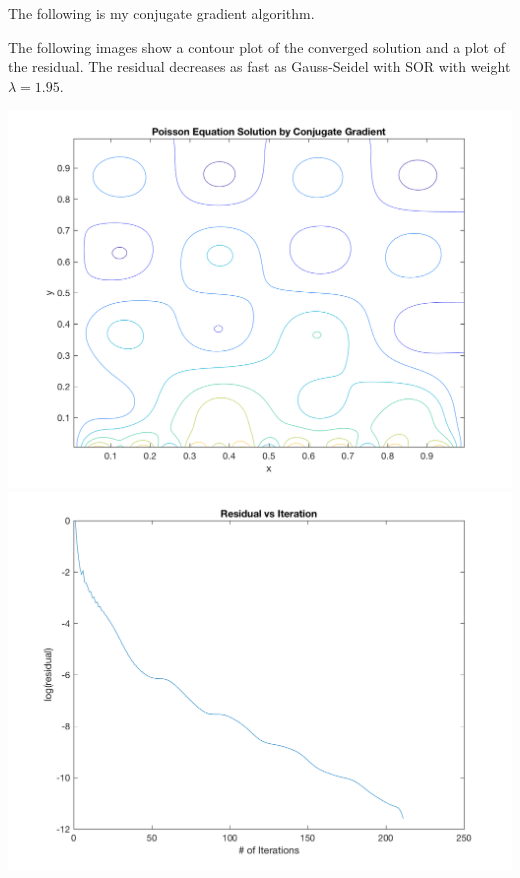 \documentclass[11pt, oneside]{article}
\begin{document}
\begin{enumerate}
    The following is my conjugate gradient algorithm.
    
    The following images show a contour plot of the converged solution and a
    plot of the residual.
    The residual decreases as fast as Gauss-Seidel with SOR with weight $\lambda = 1.95$.
    \begin{center}
      \includegraphics[scale=0.5]{Figures/05_8.png}
      \includegraphics[scale=0.5]{Figures/05_9.png}
    \end{center}

\end{enumerate}
\end{document}
